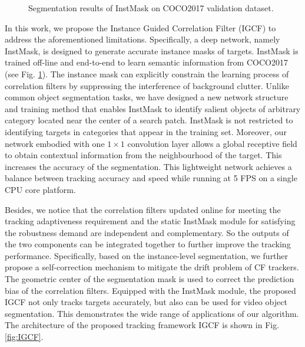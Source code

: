 \documentclass[review]{elsarticle}
\begin{document}
\begin{CJK*}{UTF8}{gbsn}
\begin{figure}
    \caption{Segmentation results of InstMask on COCO2017 \cite{Lin2014MicrosoftCC} validation dataset.}
    \label{fig:InstMask}
\end{figure}

In this work, we propose the Instance Guided Correlation Filter (IGCF) to address the aforementioned limitations. Specifically, a deep network, namely InstMask, is designed to generate accurate instance masks of targets. InstMask is trained off-line and end-to-end to learn semantic information from COCO2017\cite{Lin2014MicrosoftCC} (see Fig. \ref{fig:InstMask}). The instance mask can explicitly constrain the learning process of correlation filters by suppressing the interference of background clutter. 
Unlike common object segmentation tasks, we have designed a new network structure and training method that enables InstMask to identify salient objects of arbitrary category located near the center of a search patch. InstMask is not restricted to identifying targets in categories that appear in the training set. Moreover, our network embodied with one $1 \times 1$ convolution layer allows a global receptive field to obtain contextual information from the neighbourhood of the target. This increases the accuracy of the segmentation. This lightweight network achieves a balance between tracking accuracy and speed while running at 5 FPS on a single CPU core platform. 

Besides, we notice that the correlation filters updated online for meeting the tracking adaptiveness requirement and the static InstMask module for satisfying the robustness demand are independent and complementary. So the outputs of the two components can be integrated together to further improve the tracking performance. Specifically, based on the instance-level segmentation, we further propose a self-correction mechanism to mitigate the drift problem of CF trackers. The geometric center of the segmentation mask is used to correct the prediction bias of the correlation filters. Equipped with the InstMask module, the proposed IGCF not only tracks targets accurately, but also can be used for video object segmentation. This demonstrates the wide range of applications of our algorithm. The architecture of the proposed tracking framework IGCF is shown in Fig. \ref{fig:IGCF}.


\end{CJK*}
\end{document}
